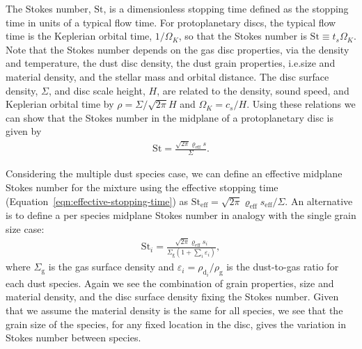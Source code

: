 \documentclass[fleqn,usenatbib]{mnras}
\newcommand{\g}{\mathrm{g}}
\newcommand{\dd}{\mathrm{d}}
\begin{document}
The Stokes number, \(\mathrm{St}\), is a dimensionless stopping time defined as
the stopping time in units of a typical flow time. For protoplanetary discs, the
typical flow time is the Keplerian orbital time, \(1/\Omega_K\), so that the
Stokes number is \(\mathrm{St} \equiv t_s \Omega_K\). Note that the Stokes
number depends on the gas disc properties, via the density and temperature, the
dust disc density, the dust grain properties, i.e.\@ size and material density,
and the stellar mass and orbital distance. The disc surface density, \(\Sigma\),
and disc scale height, \(H\), are related to the density, sound speed, and
Keplerian orbital time by \(\rho = \Sigma / \sqrt{2\pi} H\) and \(\Omega_K = c_s
/ H\). Using these relations we can show that the Stokes number in the midplane
of a protoplanetary disc is given by
%
\begin{align}
   \mathrm{St} = \frac{\sqrt{2\pi} \varrho_{\mathrm{eff}} s}{\Sigma}.
\end{align}

Considering the multiple dust species case, we can define an effective midplane
Stokes number for the mixture using the effective stopping time
(Equation~\ref{eqn:effective-stopping-time}) as \(\mathrm{St}_{\mathrm{eff}} =
\sqrt{2\pi} \varrho_{\mathrm{eff}} s_{\mathrm{eff}} / \Sigma \). An alternative
is to define a per species midplane Stokes number in analogy with the single
grain size case:
%
\begin{align}
   \label{eqn:stokes}
   \mathrm{St}_i = \frac{\sqrt{2\pi} \varrho_{\mathrm{eff}} s_i}
      {\Sigma_{\g} \left(1 + \sum_i \varepsilon_i \right)},
\end{align}
%
where \(\Sigma_{\g}\) is the gas surface density and \(\varepsilon_i =
\rho_{\dd_i} / \rho_{\g}\) is the dust-to-gas ratio for each dust species. Again
we see the combination of grain properties, size and material density, and the
disc surface density fixing the Stokes number. Given that we assume the material
density is the same for all species, we see that the grain size of the species,
for any fixed location in the disc, gives the variation in Stokes number between
species.
\end{document}
